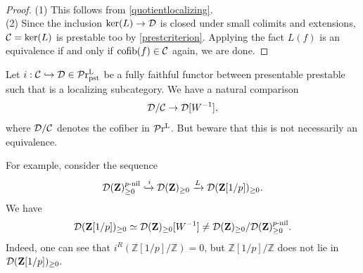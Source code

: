 \documentclass[a4paper,10pt, oneside]{amsart}
\begin{document}
	\begin{prop}\,
	\end{prop}
	\begin{proof}
		(1) This follows from \cref{quotientlocalizing}.	
		\\
		(2) Since the inclusion $\ker(L)\to\mathcal{D}$ is closed under small colimits and extensions, $\mathcal{C}=\ker(L)$ is prestable too by \cref{prestcriterion}. Applying the fact $L(f)$ is an equivalence if and only if $\mathrm{cofib}(f)\in \mathcal{C}$ again, we are done.
	\end{proof}
	\begin{rem}
	Let $i:\mathcal{C}\hookrightarrow \mathcal{D} \in \mathcal{P}\mathrm{r}^\mathrm{L}_{\mathrm{pst}}$ be a fully faithful functor between presentable prestable \infcats such that \mcc is a localizing subcategory.	We have a natural comparison $$\mathcal{D}/\mathcal{C}\to \mathcal{D}[W^{-1}],$$ where $\mathcal{D}/\mathcal{C}$ denotes the cofiber in $\mathcal{P}\mathrm{r}^\mathrm{L}$. But beware that this is not necessarily an equivalence. 
		
			For example, consider the sequence $$\mathcal{D}(\mathbf{Z})_{\geq 0}^{p\text{-}\mathrm{nil}}\xhookrightarrow{i} \mathcal{D}(\mathbf{Z})_{\geq 0} \xrightarrow{L} \mathcal{D}(\mathbf{Z}[1/p])_{\geq 0}.$$
			We have $$\mathcal{D}(\mathbf{Z}[1/p])_{\geq 0}\simeq\mathcal{D}(\mathbf{Z})_{\geq 0}[W^{-1}]\neq \mathcal{D}(\mathbf{Z})_{\geq 0}/ \mathcal{D}(\mathbf{Z})_{\geq 0}^{p\text{-}\mathrm{nil}}.$$
			Indeed, one can see that $i^R(\mathbb{Z}[1/p]/\mathbb{Z})=0$, but $\mathbb{Z}[1/p]/\mathbb{Z}$ does not lie in $\mathcal{D}(\mathbf{Z}[1/p])_{\geq 0}.$
	\end{rem}
\end{document}
